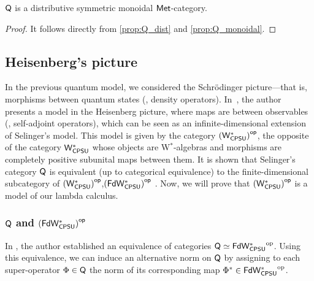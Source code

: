 \begin{theorem}
  $\mathsf{Q}$ is a distributive symmetric monoidal $\mathsf{Met}$-category. 
\end{theorem}

\begin{proof}
  It follows directly from \autoref{prop:Q_dist} and  \autoref{prop:Q_monoidal}.
\end{proof}


\subsection{Heisenberg's picture} \label{subsec:w*_cats}

In the previous quantum model, we considered the Schr\"odinger picture---that is, morphisms between quantum states (\ie, density operators). In~\cite{choSemanticsQuantumProgramming2016}, the author presents a model in the Heisenberg picture, where maps are between observables (\ie, self-adjoint operators), which can be seen as an infinite-dimensional extension of Selinger’s model. This model is given by the category $\left(\mathsf{W^*_{CPSU}}\right)^{\mathsf{op}}$, the opposite of the category $\mathsf{W^*_{CPSU}}$ whose objects are W$^*$-algebras and morphisms are completely positive subunital maps between them. It is shown that Selinger’s category $\mathsf{Q}$ is equivalent (up to categorical equivalence) to the finite-dimensional subcategory of $\left(\mathsf{W^*_{CPSU}}\right)^{\mathsf{op}}$,$\left(\mathsf{FdW^*_{CPSU}}\right)^{\mathsf{op}}$ \cite{choSemanticsQuantumProgramming2016}. Now, we will prove that $\left(\mathsf{W^*_{CPSU}}\right)^{\mathsf{op}}$ is a model of our lambda calculus.






\subsubsection{$\mathsf{Q}$ and $\left(\mathsf{FdW^*_{CPSU}}\right)^{\mathsf{op}}$}




In \cite{choSemanticsQuantumProgramming2016}, the author established an equivalence of categories  
$\mathsf{Q} \simeq \mathsf{FdW^*_{CPSU}}^{\mathrm{op}}$.  
Using this equivalence, we can induce an alternative norm on $\mathsf{Q}$ by assigning to each super-operator $\Phi \in \mathsf{Q}$ the norm of its corresponding map $\Phi^* \in \mathsf{FdW^*_{CPSU}}^{\mathrm{op}}$.


